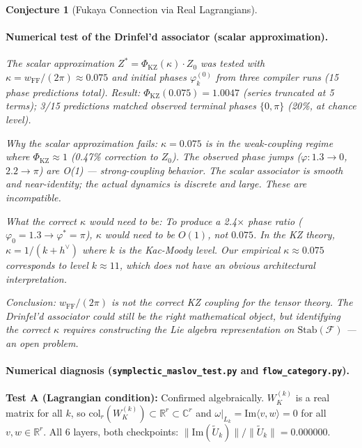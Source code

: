 \documentclass[11pt]{amsart}
\newtheorem{conjecture}[theorem]{Conjecture}
\begin{document}
\begin{conjecture}[Fukaya Connection via Real Lagrangians]
\paragraph{Numerical test of the Drinfel'd associator (scalar approximation).}
The scalar approximation $Z^* = \Phi_\mathrm{KZ}(\kappa) \cdot Z_0$ was tested with
$\kappa = w_\mathrm{FF}/(2\pi) \approx 0.075$ and initial phases $\varphi_k^{(0)}$ from
three compiler runs (15 phase predictions total).
Result: $\Phi_\mathrm{KZ}(0.075) = 1.0047$ (series truncated at 5 terms);
3/15 predictions matched observed terminal phases $\{0, \pi\}$ (20\%, at chance level).

\emph{Why the scalar approximation fails:}
$\kappa = 0.075$ is in the weak-coupling regime where $\Phi_\mathrm{KZ} \approx 1$
(0.47\% correction to $Z_0$). The observed phase jumps ($\varphi: 1.3 \to 0$,
$2.2 \to \pi$) are O(1) — strong-coupling behavior.
The scalar associator is smooth and near-identity; the actual dynamics is
discrete and large. These are incompatible.

\emph{What the correct $\kappa$ would need to be:}
To produce a 2.4$\times$ phase ratio ($\varphi_0 = 1.3 \to \varphi^* = \pi$),
$\kappa$ would need to be $O(1)$, not $0.075$.
In the KZ theory, $\kappa = 1/(k + h^\vee)$ where $k$ is the Kac-Moody level.
Our empirical $\kappa \approx 0.075$ corresponds to level $k \approx 11$,
which does not have an obvious architectural interpretation.

\emph{Conclusion:}
$w_\mathrm{FF}/(2\pi)$ is not the correct KZ coupling for the tensor theory.
The Drinfel'd associator could still be the right mathematical object,
but identifying the correct $\kappa$ requires constructing the Lie algebra
representation on $\mathrm{Stab}(\mathcal{F})$ — an open problem.
\end{conjecture}

\paragraph{Numerical diagnosis (\texttt{symplectic\_maslov\_test.py} and
\texttt{flow\_category.py}).}

\textbf{Test A (Lagrangian condition):} Confirmed algebraically.
$W_K^{(k)}$ is a real matrix for all $k$, so
$\mathrm{col}_r(W_K^{(k)}) \subset \mathbb{R}^r \subset \mathbb{C}^r$
and $\omega|_{L_k} = \mathrm{Im}\langle v, w\rangle = 0$ for all $v,w \in \mathbb{R}^r$.
All 6 layers, both checkpoints: $\|\mathrm{Im}(\tilde{U}_k)\|/\|\tilde{U}_k\| = 0.000000$. \checkmark
\end{document}
